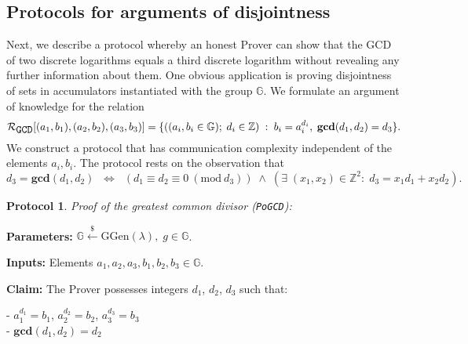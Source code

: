 \documentclass[11pt, lettersize, notitlepage, leqno, footskip=0.6cm]{article}
\newcommand{\bz}{\mathbb Z}
\newcommand{\LRA}{\Longleftrightarrow}
\newcommand{\mc}{\mathcal}
\newcommand{\mb}{\mathbb}
\newcommand{\mbf}{\mathbf}
\newcommand{\mr}{\mathrm}
\newcommand{\lamb}{\lambda}
\newcommand{\vs}{\vspace{-0.15cm}}
\newcommand{\Mod}[1]{\ (\mathrm{mod}\ #1)}
\newcommand{\GCD}{\mbf{gcd}}
\newtheorem{Prot}[Thm]{Protocol}
\numberwithin{equation}{section}
\begin{document}
\subsection{\fontsize{11}{11}\selectfont Protocols for arguments of disjointness}

Next, we describe a protocol whereby an honest Prover can show that the GCD of two discrete logarithms equals a third discrete logarithm without revealing any further information about them. One obvious application is proving disjointness of sets in accumulators instantiated with the group $\mb{G}$. We formulate an argument of knowledge for the relation \vspace{-0.15cm} $$\mc{R}_{{\protect\verb|GCD|}}[(a_1,b_1),(a_2,b_2),(a_3,b_3)] = \{((a_i, b_i\in\mb{G});\;d_i\in\bz)\;:\; b_i = a_i^{d_i},\;\GCD(d_1,d_2)=d_3  \} .$$ We construct a protocol that has communication complexity independent of the elements $a_i, b_i$. The protocol rests on the observation that \vs $$d_3 = \GCD(d_1, d_2)\;\; \LRA \;\;(d_1\equiv d_2\equiv 0 \Mod{d_3})\;\wedge \; \left(\exists \; (x_1,x_2)\in \bz^2:\; d_3 = x_1d_1+x_2d_2  \right).$$
 

\begin{Prot} \normalfont \textit{Proof of the greatest common divisor} (\verb|PoGCD|):\end{Prot} \vspace{-0.3cm}

\noindent \textbf{Parameters:} $\mb{G}\xleftarrow{\$} \mr{GGen}(\lamb), \; g\in \mb{G}$.

\noindent \textbf{Inputs:} Elements $a_1, a_2, a_3, b_1, b_2, b_3 \in \mb{G}$.

\noindent \textbf{Claim:} The Prover possesses integers $d_1$, $d_2$, $d_3$ such that:

\noindent - $a_1^{d_1} = b_1$, $a_2^{d_2} = b_2$, $a_3^{d_3} = b_3$\\
\noindent - $\GCD(d_1, d_2) = d_2$
 
\end{document}
